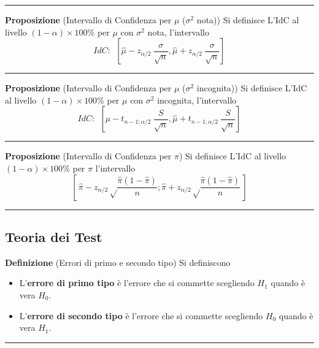 \documentclass[
  11pt,
]{book}
\providecommand{\tightlist}{%
  \setlength{\itemsep}{0pt}\setlength{\parskip}{0pt}}
\theoremstyle{mytheoremstyle}
\theoremstyle{mydefstyle}
\begin{document}
\begin{center}\rule{0.5\linewidth}{0.5pt}\end{center}

\textbf{Proposizione} (Intervallo di Confidenza per \(\mu\) (\(\sigma^2\) nota))
Si definisce L'IdC al livello \((1-\alpha)\times100\%\) per \(\mu\) con \(\sigma^2\) nota, l'intervallo
\[IdC:~~\left[\hat \mu- z_{\alpha/2}~\frac\sigma{\sqrt n},\hat \mu+ z_{\alpha/2}~\frac\sigma{\sqrt n}\right]\]

\begin{center}\rule{0.5\linewidth}{0.5pt}\end{center}

\textbf{Proposizione} (Intervallo di Confidenza per \(\mu\) (\(\sigma^2\) incognita))
Si definisce L'IdC al livello \((1-\alpha)\times100\%\) per \(\mu\) con \(\sigma^2\) incognita, l'intervallo
\[IdC:~~\left[\hat \mu- t_{n-1;\alpha/2}~\frac S{\sqrt n},\hat \mu+ t_{n-1;\alpha/2}~\frac S{\sqrt n}\right]\]

\begin{center}\rule{0.5\linewidth}{0.5pt}\end{center}

\textbf{Proposizione} (Intervallo di Confidenza per \(\pi\))
Si definisce L'IdC al livello \((1-\alpha)\times100\%\) per \(\pi\) l'intervallo
\[\left[\,\hat\pi-z_{\alpha/2}\sqrt\frac{\hat\pi(1-\hat\pi)}{n};\hat\pi+z_{\alpha/2}\sqrt\frac{\hat\pi(1-\hat\pi)}{n}\,\right]\]

\begin{center}\rule{0.5\linewidth}{0.5pt}\end{center}

\subsection{Teoria dei Test}\label{teoria-dei-test-1}

\textbf{Definizione} (Errori di primo e secondo tipo)
Si definiscono

\begin{itemize}
\tightlist
\item
  L'\textbf{errore di primo tipo} è l'errore che si commette scegliendo \(H_1\) quando è vera \(H_0\).
\item
  L'\textbf{errore di secondo tipo} è l'errore che si commette scegliendo \(H_0\) quando è vera \(H_1\).
\end{itemize}

\begin{center}\rule{0.5\linewidth}{0.5pt}\end{center}
\end{document}
